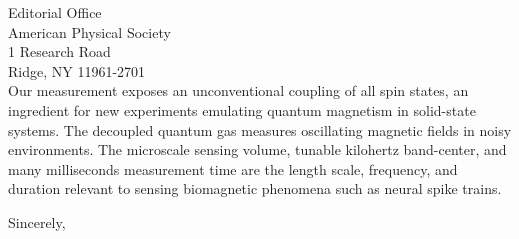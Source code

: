 \documentclass[10pt,letterpaper]{letter} %
\begin{document}
\begin{letter}{
    Editorial Office\\
    American Physical Society\\
    1 Research Road \\
    Ridge, NY 11961-2701\\
}
Our measurement exposes an unconventional coupling of all spin states, an ingredient for new experiments emulating quantum magnetism in solid-state systems.
The decoupled quantum gas measures oscillating magnetic fields in noisy environments.
The microscale sensing volume, tunable kilohertz band-center, and many milliseconds measurement time are the length scale, frequency, and duration relevant to sensing biomagnetic phenomena such as neural spike trains.

\closing{Sincerely,}

\def\thefootnote{}
\def\footnoterule{\hrule}
\def\thefootnote{footnote}

\end{letter}
\end{document}

